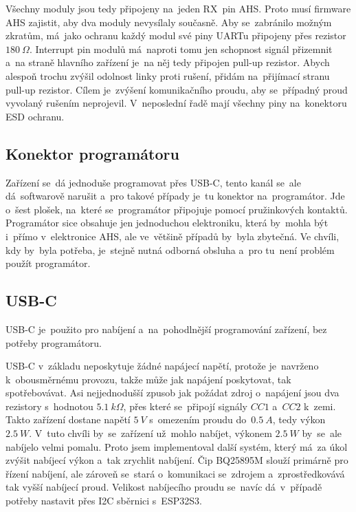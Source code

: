 Všechny moduly jsou tedy připojeny na~jeden RX~pin AHS.
Proto musí firmware AHS zajistit, aby dva moduly nevysílaly současně.
Aby se~zabránilo možným zkratům, má~jako ochranu každý modul své piny UARTu připojeny přes rezistor \(180~\Omega\).
Interrupt pin modulů má~naproti tomu jen schopnost signál přizemnit a~na straně hlavního zařízení je~na něj tedy připojen pull-up rezistor.
Abych alespoň trochu zvýšil odolnost linky proti rušení, přidám na~přijímací stranu pull-up rezistor.
Cílem je~zvýšení komunikačního proudu, aby se~případný proud vyvolaný rušením neprojevil.
V~neposlední řadě mají všechny piny na~konektoru ESD ochranu\cite{TPD4E02B04}.

\subsection{Konektor programátoru}
Zařízení se~dá jednoduše programovat přes USB-C, tento kanál se~ale dá~softwarově narušit a~pro takové případy je~tu konektor na~programátor.
Jde o~šest plošek, na~které se~programátor připojuje pomocí pružinkových kontaktů.
Programátor sice obsahuje jen jednoduchou elektroniku, která by~mohla být i~přímo v~elektronice AHS, ale ve~většině případů by~byla zbytečná.
Ve chvíli, kdy by~byla potřeba, je~stejně nutná odborná obsluha a~pro tu~není problém použít programátor.

\subsection{USB-C}
USB-C je~použito pro nabíjení a~na~pohodlnější programování zařízení, bez potřeby programátoru.

USB-C v~základu neposkytuje žádné napájecí napětí, protože je~navrženo k~obousměrnému provozu, takže může jak napájení poskytovat, tak spotřebovávat.
Asi nejjednodušší zpusob jak požádat zdroj o~napájení jsou dva rezistory s~hodnotou \(5.1~k\Omega\), přes které se~připojí signály \(CC1\) a~\(CC2\) k~zemi.
Takto zařízení dostane napětí \(5~V\) s~omezením proudu do~\(0.5~A\), tedy výkon \(2.5~W\).
V~tuto chvíli by~se~zařízení už~mohlo nabíjet, výkonem \(2.5~W\) by~se~ale nabíjelo velmi pomalu.
Proto jsem implementoval další systém, který má~za úkol zvýšit nabíjecí výkon a~tak zrychlit nabíjení.
Čip BQ25895M \cite{BQ25895} slouží primárně pro řízení nabíjení, ale zároveň se~stará o~komunikaci se~zdrojem a~zprostředkovává tak vyšší nabíjecí proud.
Velikost nabíjecího proudu se~navíc dá~v~případě potřeby nastavit přes I2C sběrnici s~ESP32S3.

